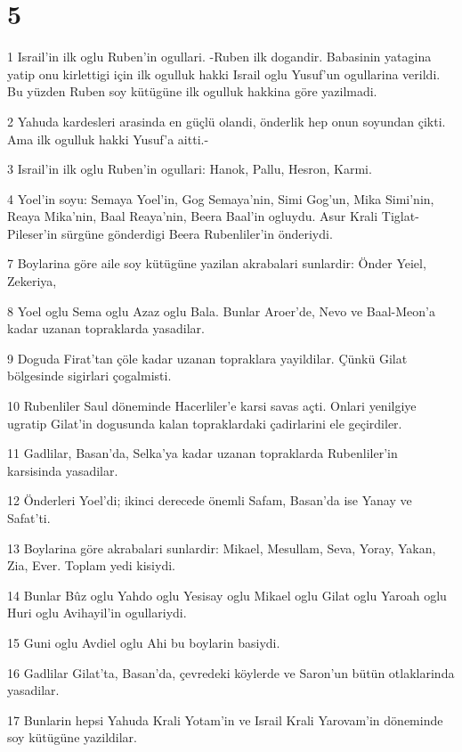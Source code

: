 \chapter{5}

\par 1 Israil'in ilk oglu Ruben'in ogullari. -Ruben ilk dogandir. Babasinin yatagina yatip onu kirlettigi için ilk ogulluk hakki Israil oglu Yusuf'un ogullarina verildi. Bu yüzden Ruben soy kütügüne ilk ogulluk hakkina göre yazilmadi.
\par 2 Yahuda kardesleri arasinda en güçlü olandi, önderlik hep onun soyundan çikti. Ama ilk ogulluk hakki Yusuf'a aitti.-
\par 3 Israil'in ilk oglu Ruben'in ogullari: Hanok, Pallu, Hesron, Karmi.
\par 4 Yoel'in soyu: Semaya Yoel'in, Gog Semaya'nin, Simi Gog'un, Mika Simi'nin, Reaya Mika'nin, Baal Reaya'nin, Beera Baal'in ogluydu. Asur Krali Tiglat-Pileser'in sürgüne gönderdigi Beera Rubenliler'in önderiydi.
\par 7 Boylarina göre aile soy kütügüne yazilan akrabalari sunlardir: Önder Yeiel, Zekeriya,
\par 8 Yoel oglu Sema oglu Azaz oglu Bala. Bunlar Aroer'de, Nevo ve Baal-Meon'a kadar uzanan topraklarda yasadilar.
\par 9 Doguda Firat'tan çöle kadar uzanan topraklara yayildilar. Çünkü Gilat bölgesinde sigirlari çogalmisti.
\par 10 Rubenliler Saul döneminde Hacerliler'e karsi savas açti. Onlari yenilgiye ugratip Gilat'in dogusunda kalan topraklardaki çadirlarini ele geçirdiler.
\par 11 Gadlilar, Basan'da, Selka'ya kadar uzanan topraklarda Rubenliler'in karsisinda yasadilar.
\par 12 Önderleri Yoel'di; ikinci derecede önemli Safam, Basan'da ise Yanay ve Safat'ti.
\par 13 Boylarina göre akrabalari sunlardir: Mikael, Mesullam, Seva, Yoray, Yakan, Zia, Ever. Toplam yedi kisiydi.
\par 14 Bunlar Bûz oglu Yahdo oglu Yesisay oglu Mikael oglu Gilat oglu Yaroah oglu Huri oglu Avihayil'in ogullariydi.
\par 15 Guni oglu Avdiel oglu Ahi bu boylarin basiydi.
\par 16 Gadlilar Gilat'ta, Basan'da, çevredeki köylerde ve Saron'un bütün otlaklarinda yasadilar.
\par 17 Bunlarin hepsi Yahuda Krali Yotam'in ve Israil Krali Yarovam'in döneminde soy kütügüne yazildilar.
